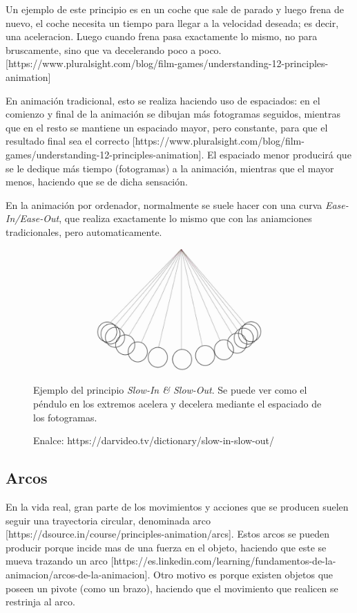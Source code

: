 \documentclass{article}
\begin{document}
\bigskip

Un ejemplo de este principio es en un coche que sale de parado y luego frena de nuevo, el coche necesita un tiempo para llegar a la velocidad deseada; es decir, una aceleracion. Luego cuando frena pasa exactamente lo mismo, no para bruscamente, sino que va decelerando poco a poco. [https://www.pluralsight.com/blog/film-games/understanding-12-principles-animation]

\bigskip

En animación tradicional, esto se realiza haciendo uso de espaciados: en el comienzo y final de la animación se dibujan más fotogramas seguidos, mientras que en el resto se mantiene un espaciado mayor, pero constante, para que el resultado final sea el correcto [https://www.pluralsight.com/blog/film-games/understanding-12-principles-animation]. El espaciado menor producirá que se le dedique más tiempo (fotogramas) a la animación, mientras que el mayor menos, haciendo que se de dicha sensación.

\bigskip

En la animación por ordenador, normalmente se suele hacer con una curva \textit{Ease-In/Ease-Out}, que realiza exactamente lo mismo que con las aniamciones tradicionales, pero automaticamente.

\begin{figure}[H]
    \centering
    \includegraphics[width=\textwidth]{imagenes/Slow-In-and-Slow-Out.jpg}
    \caption{Ejemplo del principio \textit{Slow-In \& Slow-Out}. Se puede ver como el péndulo en los extremos acelera y decelera mediante el espaciado de los fotogramas.}
    \caption{Enalce: https://darvideo.tv/dictionary/slow-in-slow-out/}
\end{figure}

\subsection{Arcos}

En la vida real, gran parte de los movimientos y acciones que se producen suelen seguir una trayectoria circular, denominada arco [https://dsource.in/course/principles-animation/arcs]. Estos arcos se pueden producir porque incide mas de una fuerza en el objeto, haciendo que este se mueva trazando un arco [https://es.linkedin.com/learning/fundamentos-de-la-animacion/arcos-de-la-animacion]. Otro motivo es porque existen objetos que poseen un pivote (como un brazo), haciendo que el movimiento que realicen se restrinja al arco.
\end{document}
